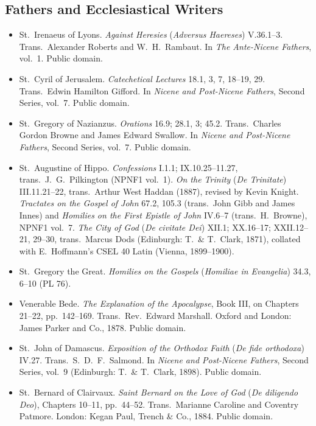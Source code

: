 \subsection*{Fathers and Ecclesiastical Writers}

\begin{itemize}
\item St.\ Irenaeus of Lyons. \textit{Against Heresies} (\textit{Adversus Haereses}) V.36.1--3. Trans.\ Alexander Roberts and W.\ H.\ Rambaut. In \textit{The Ante-Nicene Fathers}, vol.\ 1. Public domain.
\item St.\ Cyril of Jerusalem. \textit{Catechetical Lectures} 18.1, 3, 7, 18--19, 29. Trans.\ Edwin Hamilton Gifford. In \textit{Nicene and Post-Nicene Fathers}, Second Series, vol.\ 7. Public domain.
\item St.\ Gregory of Nazianzus. \textit{Orations} 16.9; 28.1, 3; 45.2. Trans.\ Charles Gordon Browne and James Edward Swallow. In \textit{Nicene and Post-Nicene Fathers}, Second Series, vol.\ 7. Public domain.
\item St.\ Augustine of Hippo. \textit{Confessions} I.1.1; IX.10.25--11.27, trans.\ J.\ G.\ Pilkington (NPNF1 vol.\ 1). \textit{On the Trinity} (\textit{De Trinitate}) III.11.21--22, trans.\ Arthur West Haddan (1887), revised by Kevin Knight. \textit{Tractates on the Gospel of John} 67.2, 105.3 (trans.\ John Gibb and James Innes) and \textit{Homilies on the First Epistle of John} IV.6--7 (trans.\ H.\ Browne), NPNF1 vol.\ 7. \textit{The City of God} (\textit{De civitate Dei}) XII.1; XX.16--17; XXII.12--21, 29--30, trans.\ Marcus Dods (Edinburgh: T.\ \& T.\ Clark, 1871), collated with E.\ Hoffmann's CSEL 40 Latin (Vienna, 1899--1900).
\item St.\ Gregory the Great. \textit{Homilies on the Gospels} (\textit{Homiliae in Evangelia}) 34.3, 6--10 (PL 76).
\item Venerable Bede. \textit{The Explanation of the Apocalypse}, Book III, on Chapters 21--22, pp.\ 142--169. Trans.\ Rev.\ Edward Marshall. Oxford and London: James Parker and Co., 1878. Public domain.
\item St.\ John of Damascus. \textit{Exposition of the Orthodox Faith} (\textit{De fide orthodoxa}) IV.27. Trans.\ S.\ D.\ F.\ Salmond. In \textit{Nicene and Post-Nicene Fathers}, Second Series, vol.\ 9 (Edinburgh: T.\ \& T.\ Clark, 1898). Public domain.
\item St.\ Bernard of Clairvaux. \textit{Saint Bernard on the Love of God} (\textit{De diligendo Deo}), Chapters 10--11, pp.\ 44--52. Trans.\ Marianne Caroline and Coventry Patmore. London: Kegan Paul, Trench \& Co., 1884. Public domain.
\end{itemize}

